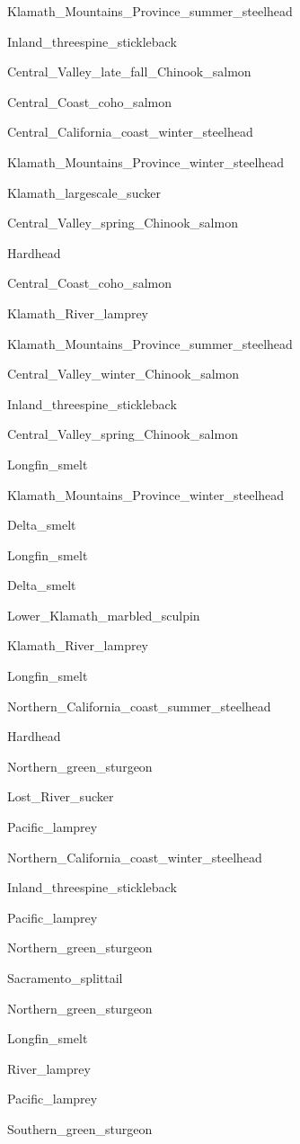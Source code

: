 \documentclass[]{article}
\begin{document}
Klamath\_Mountains\_Province\_summer\_steelhead

Inland\_threespine\_stickleback

Central\_Valley\_late\_fall\_Chinook\_salmon

Central\_Coast\_coho\_salmon

Central\_California\_coast\_winter\_steelhead

Klamath\_Mountains\_Province\_winter\_steelhead

Klamath\_largescale\_sucker

Central\_Valley\_spring\_Chinook\_salmon

Hardhead

Central\_Coast\_coho\_salmon

Klamath\_River\_lamprey

Klamath\_Mountains\_Province\_summer\_steelhead

Central\_Valley\_winter\_Chinook\_salmon

Inland\_threespine\_stickleback

Central\_Valley\_spring\_Chinook\_salmon

Longfin\_smelt

Klamath\_Mountains\_Province\_winter\_steelhead

Delta\_smelt

Longfin\_smelt

Delta\_smelt

Lower\_Klamath\_marbled\_sculpin

Klamath\_River\_lamprey

Longfin\_smelt

Northern\_California\_coast\_summer\_steelhead

Hardhead

Northern\_green\_sturgeon

Lost\_River\_sucker

Pacific\_lamprey

Northern\_California\_coast\_winter\_steelhead

Inland\_threespine\_stickleback

Pacific\_lamprey

Northern\_green\_sturgeon

Sacramento\_splittail

Northern\_green\_sturgeon

Longfin\_smelt

River\_lamprey

Pacific\_lamprey

Southern\_green\_sturgeon
\end{document}
